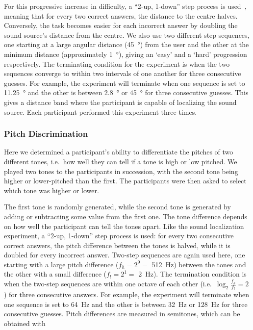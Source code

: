 \documentclass[acmsmall]{acmart}
\begin{document}
For this progressive increase in difficulty, a ``2-up, 1-down'' step process is used~\citep{wetherill1965sequential,levitt1971transformed}, meaning that for every two correct answers, the distance to the centre halves.
Conversely, the task becomes easier for each incorrect answer by doubling the sound source's distance from the centre.
We also use two different step sequences, one starting at a large angular distance (\SI{45}{\degree}) from the user and the other at the minimum distance (approximately \SI{1}{\degree}), giving an `easy' and a `hard' progression respectively.
The terminating condition for the experiment is when the two sequences converge to within two intervals of one another for three consecutive guesses.
For example, the experiment will terminate when one sequence is set to \SI{11.25}{\degree} and the other is between \SI{2.8}{\degree} or \SI{45}{\degree} for three consecutive guesses.
This gives a distance band where the participant is capable of localizing the sound source.
Each participant performed this experiment three times. 

\subsubsection{Pitch Discrimination}\label{sec:pitch_discrimination}

Here we determined a participant's ability to differentiate the pitches of two different tones, i.e.\ how well they can tell if a tone is high or low pitched.
We played two tones to the participants in succession, with the second tone being higher or lower-pitched than the first.
The participants were then asked to select which tone was higher or lower.

The first tone is randomly generated, while the second tone is generated by adding or subtracting some value from the first one.
The tone difference depends on how well the participant can tell the tones apart.
Like the sound localization experiment, a ``2-up, 1-down'' step process is used: for every two consecutive correct answers, the pitch difference between the tones is halved, while it is doubled for every incorrect answer.
Two-step sequences are again used here, one starting with a large pitch difference ($f_h=2^9=$ \SI{512}{\hertz}) between the tones and the other with a small difference ($f_l=2^1=$ \SI{2}{\hertz}).
The termination condition is when the two-step sequences are within one octave of each other (i.e.\ $\log_2\frac{f_h}{f_l}=2$) for three consecutive answers.
For example, the experiment will terminate when one sequence is set to \SI{64}{\hertz} and the other is between \SI{32}{\hertz} or \SI{128}{\hertz} for three consecutive guesses.
Pitch differences are measured in semitones, which can be obtained with
\end{document}
